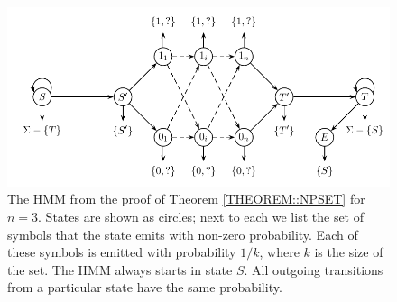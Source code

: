 \begin{figure}
\centerline{\includegraphics[scale=0.68]{../figures/jcss/expandedcliquehmm.pdf}}
\caption[HMM for which set is NP-hard to optimize]{The HMM from the proof of Theorem
  \ref{THEOREM::NPSET} for $n=3$. States are shown as circles; next to each we
  list the set of symbols that the state emits with non-zero
  probability. Each of these symbols is emitted with probability
  $1/k$, where $k$ is the size of the set. The HMM always starts in
  state $S$. All outgoing transitions from a particular state have
  the same probability.}\label{fig:set_hmm2}
\end{figure}

